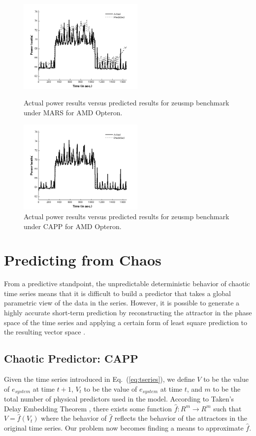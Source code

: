 \documentclass[times,10pt,finalversion]{usetex-v1}
\begin{document}
\begin{figure}[!b]
  \begin{minipage}[b]{0.5\linewidth}
      \centering
      \includegraphics[width=1.0\linewidth,height=1.8in]{amdzeusmars}
      \caption{Actual power results versus predicted results for zeusmp
        benchmark under MARS for AMD Opteron.}
      \label{fig:amdzeusmars}
  \end{minipage}\quad
  \begin{minipage}[b]{0.5\linewidth}
      \centering
      \includegraphics[width=1.0\linewidth,height=1.8in]{amdzeuspredict}
      \caption{Actual power results versus predicted results for zeusmp
        benchmark under CAPP for AMD Opteron.}
      \label{fig:amdzeuscapp}
  \end{minipage}
\end{figure}
\section{Predicting from Chaos}
\label{sec:cappredict}
From a predictive standpoint, the unpredictable deterministic behavior
of chaotic time series means that it is difficult to build a predictor
that takes a global parametric view of the data in the series.  However,
it is possible to generate a highly accurate short-term prediction by
reconstructing the attractor in the phase space of the time series and
applying a certain form of least square prediction to the resulting vector
space \cite{Itoh1995}.
\subsection{Chaotic Predictor: CAPP}
\label{sec:cap}
Given the time series introduced in Eq.~(\ref{eq:tseries}), we define
$V$ to be the value of $e_{system}$ at time $t+1$, $V_{t}$ to be the value
of $e_{system}$ at time $t$, and $m$ to be the total number of physical
predictors used in the model.  According to Taken's Delay Embedding
Theorem \cite{Sprott2003}, there exists some function $\hat{f}:R^{m}
\rightarrow R^{m}$ such that $V=\hat{f}(V_{t})$ where the behavior of
$\hat{f}$ reflects the behavior of the attractors in the
original time series.  Our problem now becomes finding a means to
approximate  $\hat{f}$.
\end{document}

